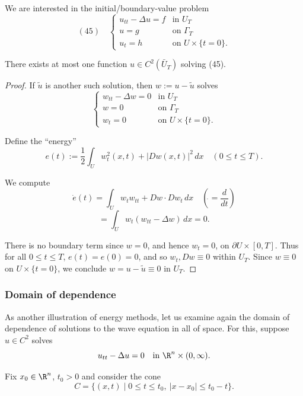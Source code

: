 We are interested in the initial/boundary-value problem
$$(45) \quad \begin{cases} u_{tt} - \Delta u = f & \text{in } U_T \\ u = g & \text{on } \Gamma_T \\ u_t = h & \text{on } U \times \{t=0\}. \end{cases}$$

\begin{theorem}
\label{thm:uniqueness-wave-equation-energy-method}
There exists at most one function $u \in C^2(\bar{U}_T)$ solving (45).
\end{theorem}

\begin{proof}
If $\tilde{u}$ is another such solution, then $w := u - \tilde{u}$ solves
$$\begin{cases} w_{tt} - \Delta w = 0 & \text{in } U_T \\ w = 0 & \text{on } \Gamma_T \\ w_t = 0 & \text{on } U \times \{t=0\}. \end{cases}$$

Define the ``energy''
$$e(t) := \frac12 \int_U w_t^2(x,t) + |Dw(x,t)|^2\,dx \quad (0 \leq t \leq T).$$

We compute
$$\dot{e}(t) = \int_U w_t w_{tt} + Dw \cdot Dw_t\,dx \quad \left(\dot{} = \frac{d}{dt}\right)$$
$$= \int_U w_t(w_{tt} - \Delta w)\,dx = 0.$$

There is no boundary term since $w = 0$, and hence $w_t = 0$, on $\partial U \times [0,T]$. Thus for all $0 \leq t \leq T$, $e(t) = e(0) = 0$, and so $w_t, Dw \equiv 0$ within $U_T$. Since $w \equiv 0$ on $U \times \{t=0\}$, we conclude $w = u - \tilde{u} \equiv 0$ in $U_T$.
\end{proof}

\subsubsection{Domain of dependence}
\label{sec:wave-domain-of-dependence}

As another illustration of energy methods, let us examine again the domain of dependence of solutions to the wave equation in all of space. For this, suppose $u \in C^2$ solves
$$u_{tt} - \Delta u = 0 \quad \text{in } \R^n \times (0,\infty).$$

Fix $x_0 \in \R^n$, $t_0 > 0$ and consider the cone
$$C = \{(x,t) \mid 0 \leq t \leq t_0,\ |x-x_0| \leq t_0-t\}.$$

